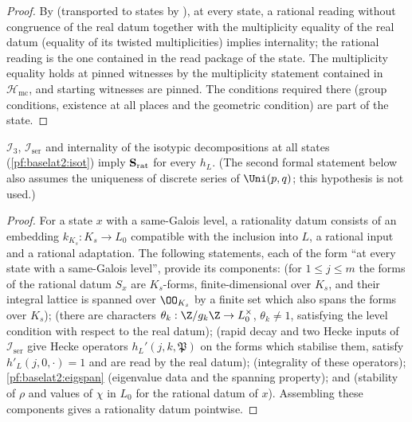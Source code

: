 \begin{proof}
By  (transported to states by
), at every state, a rational reading
without congruence of the real datum together with the multiplicity equality of the real datum (equality of
its twisted multiplicities) implies internality; the rational reading is the one contained in the read package of the state.
The multiplicity equality holds at pinned witnesses by the multiplicity statement contained in
$\mathcal{H}_{\mathrm{mc}}$, and starting witnesses are pinned. The conditions required there (group
conditions, existence at all places and the geometric condition) are part of the state.
\end{proof}

\begin{proposition}\label{pf:baselat2:rat}
$\mathcal{I}_3$, $\mathcal{I}_{\mathrm{ser}}$ and internality of the isotypic decompositions at
all states (\cref{pf:baselat2:isot}) imply $\mathbf{S}_{\mathrm{rat}}$ for every $h_L$. (The second formal statement below
also assumes the uniqueness of discrete series of $\Uni(p,q)$; this hypothesis is not used.)
\end{proposition}

\begin{proof}
For a state $x$ with a same-Galois level, a rationality datum consists of an embedding
$k_{K_s}:K_s\to L_0$ compatible with the inclusion into $L$, a rational input and a rational adaptation. The following statements, each of the form ``at every state with a same-Galois
level'', provide its components:
 (for $1\le j\le m$ the forms of the rational datum $S_x$ are $K_s$-forms, finite-dimensional over $K_s$, and
their integral lattice is spanned over $\OO_{K_s}$ by a finite set which also spans the forms over $K_s$);
 (there are characters
$\theta_k:\Z/g_k\Z\to L_0^\times$, $\theta_k\neq1$, satisfying the level condition with respect to the real datum);
 (rapid decay and two Hecke
inputs of $\mathcal{I}_{\mathrm{ser}}$ give Hecke operators $h_L'(j,k,\mathfrak P)$ on the forms which stabilise them, satisfy
$h'_L(j,0,\cdot)=1$ and are read by the real datum);
 (integrality of these operators);
\cref{pf:baselat2:eigspan} (eigenvalue data and the spanning property); and
 (stability of $\rho$ and values of $\chi$ in $L_0$
for the rational datum of $x$). Assembling these components gives a rationality datum pointwise.
\end{proof}

